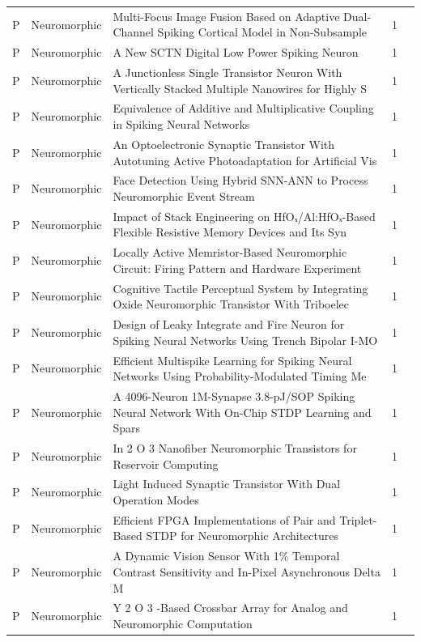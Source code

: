 \documentclass[10pt]{article}
\begin{document}
\begin{longtable}{@{}llL{8.6cm}lL{4.2cm}@{}}
P & Neuromorphic & Multi-Focus Image Fusion Based on Adaptive Dual-Channel Spiking Cortical Model in Non-Subsample & 1 &  \\
P & Neuromorphic & A New SCTN Digital Low Power Spiking Neuron & 1 &  \\
P & Neuromorphic & A Junctionless Single Transistor Neuron With Vertically Stacked Multiple Nanowires for Highly S & 1 &  \\
P & Neuromorphic & Equivalence of Additive and Multiplicative Coupling in Spiking Neural Networks & 1 &  \\
P & Neuromorphic & An Optoelectronic Synaptic Transistor With Autotuning Active Photoadaptation for Artificial Vis & 1 &  \\
P & Neuromorphic & Face Detection Using Hybrid SNN-ANN to Process Neuromorphic Event Stream & 1 &  \\
P & Neuromorphic & Impact of Stack Engineering on HfOₓ/Al:HfOₓ-Based Flexible Resistive Memory Devices and Its Syn & 1 &  \\
P & Neuromorphic & Locally Active Memristor-Based Neuromorphic Circuit: Firing Pattern and Hardware Experiment & 1 &  \\
P & Neuromorphic & Cognitive Tactile Perceptual System by Integrating Oxide Neuromorphic Transistor With Triboelec & 1 &  \\
P & Neuromorphic & Design of Leaky Integrate and Fire Neuron for Spiking Neural Networks Using Trench Bipolar I-MO & 1 &  \\
P & Neuromorphic & Efficient Multispike Learning for Spiking Neural Networks Using Probability-Modulated Timing Me & 1 &  \\
P & Neuromorphic & A 4096-Neuron 1M-Synapse 3.8-pJ/SOP Spiking Neural Network With On-Chip STDP Learning and Spars & 1 &  \\
P & Neuromorphic & In 2 O 3 Nanofiber Neuromorphic Transistors for Reservoir Computing & 1 &  \\
P & Neuromorphic & Light Induced Synaptic Transistor With Dual Operation Modes & 1 &  \\
P & Neuromorphic & Efficient FPGA Implementations of Pair and Triplet-Based STDP for Neuromorphic Architectures & 1 &  \\
P & Neuromorphic & A Dynamic Vision Sensor With 1\% Temporal Contrast Sensitivity and In-Pixel Asynchronous Delta M & 1 &  \\
P & Neuromorphic & Y 2 O 3 -Based Crossbar Array for Analog and Neuromorphic Computation & 1 &  \\

\end{longtable}
\end{document}
